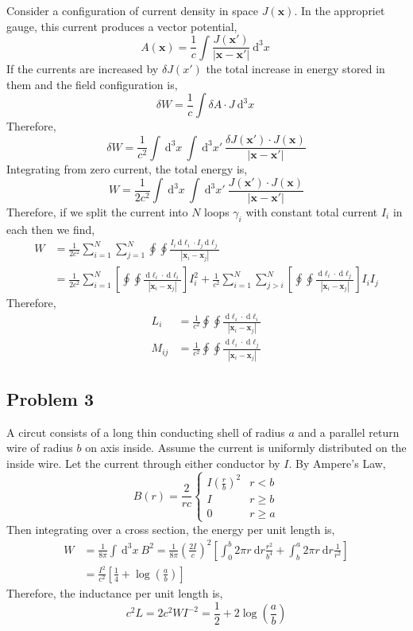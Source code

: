 \documentclass[12pt]{extarticle}
\renewcommand{\d}[1]{\: \mathrm{d}#1}
\newcommand{\dn}[2]{\: \mathrm{d}^{#1} #2 \:}
\renewcommand{\bf}[1]{\mathbf{#1}}
\theoremstyle{definition}
\begin{document}
Consider a configuration of current density in space $J(\bf{x})$. In the appropriet gauge, this current produces a vector potential,
\[ A(\bf{x}) = \frac{1}{c} \int \frac{J(\bf{x}')}{|\bf{x} - \bf{x}'|} \dn{3}{x} \]
If the currents are increased by $\delta J(x')$ the total increase in energy stored in them and the field configuration is,
\[ \delta W = \frac{1}{c} \int \delta A \cdot J \dn{3}{x} \]
Therefore,
\[ \delta W = \frac{1}{c^2} \int \dn{3}{x} \int \dn{3}{x'} \frac{\delta J(\bf{x}') \cdot J(\bf{x})}{| \bf{x} - \bf{x}' |} \]
Integrating from zero current, the total energy is,
\[ W = \frac{1}{2 c^2} \int \dn{3}{x} \int \dn{3}{x'} \frac{ J(\bf{x}') \cdot J(\bf{x})}{| \bf{x} - \bf{x}' |} \]
Therefore, if we split the current into $N$ loops $\gamma_i$ with constant total current $I_i$ in each then we find,
\begin{align*}
W & = \frac{1}{2 c^2} \sum_{i = 1}^N \sum_{j = 1}^N \oint \oint \frac{I_i \d{\ell_i} \cdot I_j \d{\ell_j}}{|\bf{x}_i - \bf{x}_j|}
\\
& = \frac{1}{2c^2} \sum_{i = 1}^N \left[ \oint \oint \frac{\d{\ell_i} \cdot \d{\ell_i}}{|\bf{x}_i - \bf{x}_j|} \right] I_i^2 + \frac{1}{c^2} \sum_{i = 1}^N \sum_{j > i}^N \left[ \oint \oint \frac{\d{\ell_i} \cdot \d{\ell_j}}{|\bf{x}_i - \bf{x}_j|} \right] I_i I_j 
\end{align*}
Therefore,
\begin{align*}
L_i & = \frac{1}{c^2} \oint \oint \frac{\d{\ell_i} \cdot \d{\ell_i}}{|\bf{x}_i - \bf{x}_j|}
\\
M_{ij} & = \frac{1}{c^2} \oint \oint \frac{\d{\ell_i} \cdot \d{\ell_j}}{|\bf{x}_i - \bf{x}_j|}
\end{align*}

\subsection{Problem 3}

A circut consists of a long thin conducting shell of radius $a$ and a parallel return wire of radius $b$ on axis inside. Assume the current is uniformly distributed on the inside wire. Let the current through either conductor by $I$. By Ampere's Law,
\[ 
B(r) = \frac{2}{rc}
\begin{cases}
I \left( \frac{r}{b} \right)^2 & r < b
\\
I & r \ge b
\\
0 & r \ge a
\end{cases} 
\]
Then integrating over a cross section, the energy per unit length is,
\begin{align*}
W & = \frac{1}{8 \pi} \int \dn{3}{x} B^2 = \frac{1}{8 \pi} \left( \frac{2I}{c} \right)^2 \left[ \int_0^b 2 \pi r \d{r} \frac{r^2}{b^4} + \int_b^a 2 \pi r \d{r} \frac{1}{r^2} \right]
\\
& = \frac{I^2}{c^2} \left[ \frac{1}{4} + \log{\left( \frac{a}{b} \right)} \right] 
\end{align*} 
Therefore, the inductance per unit length is,
\[ c^2 L = 2 c^2 W I^{-2} = \frac{1}{2} + 2 \log{\left( \frac{a}{b} \right)} \]
\end{document}
